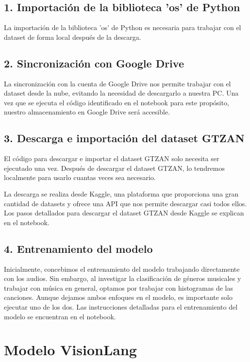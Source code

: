 \documentclass[colorinlistoftodos,twoside,twocolumn,10pt]{article} %
\begin{document}
\subsection*{1. Importación de la biblioteca 'os' de Python}

La importación de la biblioteca 'os' de Python es necesaria para trabajar con el dataset de forma local después de la descarga.

\subsection*{2. Sincronización con Google Drive}

La sincronización con la cuenta de Google Drive nos permite trabajar con el dataset desde la nube, evitando la necesidad de descargarlo a nuestra PC. Una vez que se ejecuta el código identificado en el notebook para este propósito, nuestro almacenamiento en Google Drive será accesible.

\subsection*{3. Descarga e importación del dataset GTZAN}

El código para descargar e importar el dataset GTZAN solo necesita ser ejecutado una vez. Después de descargar el dataset GTZAN, lo tendremos localmente para usarlo cuantas veces sea necesario.

La descarga se realiza desde Kaggle, una plataforma que proporciona una gran cantidad de datasets y ofrece una API que nos permite descargar casi todos ellos. Los pasos detallados para descargar el dataset GTZAN desde Kaggle se explican en el notebook.

\subsection*{4. Entrenamiento del modelo}

Inicialmente, concebimos el entrenamiento del modelo trabajando directamente con los audios. Sin embargo, al investigar la clasificación de géneros musicales y trabajar con música en general, optamos por trabajar con histogramas de las canciones. Aunque dejamos ambos enfoques en el modelo, es importante solo ejecutar uno de los dos. Las instrucciones detalladas para el entrenamiento del modelo se encuentran en el notebook.

\section{Modelo VisionLang}
\end{document}
